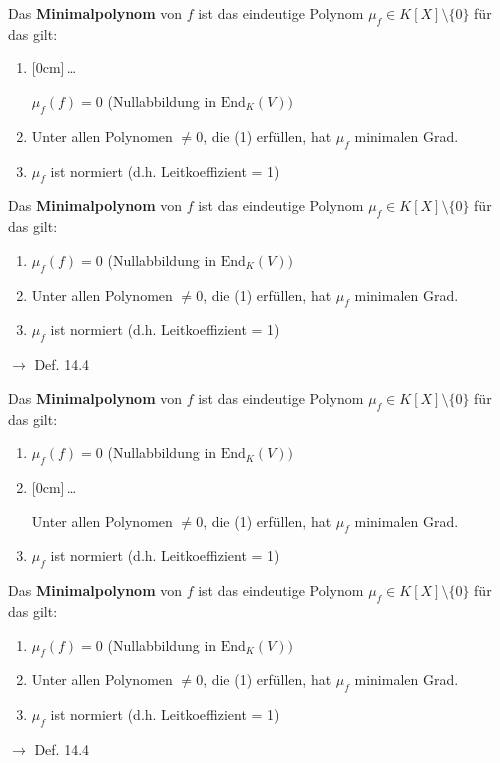 \documentclass[11pt]{article}
\renewcommand{\cite}[1]{\par\bigskip\hfill{\color{gray}\tiny\(\to\) #1}}
\newcommand{\hide}[1]{\parbox{0cm}{\raisebox{-7pt}[0cm]{\dots}}\color{white}#1\color{black}}
\let\olddots\dots
\renewcommand{\dots}{\,\olddots\,}
\newenvironment{field}{}{\newpage}
\newif\ifnote
\newenvironment{note}{\notetrue}{\notefalse}
\newcommand{\localtag}{}
\newcommand{\globaltag}{}
\newcommand{\uuid}{}
\newcommand{\tags}[1]{
    \ifnote
        \renewcommand{\localtag}{#1}
    \else
        \renewcommand{\globaltag}{#1}
    \fi
    }
\newcommand{\xplain}[1]{\renewcommand{\uuid}{#1}}
\begin{document}
\begin{note}
    \tags{Def}
    \xplain{ec41baef-a06e-43ff-a6d0-24b3ae262be4}

    \begin{field}
        Das \textbf{Minimalpolynom} von $f$ ist das eindeutige Polynom $\mu_f\in K[X]\setminus{\{0\}}$ für das gilt:
        \begin{enumerate}[(1)]
            \item \hide{$\mu_f(f)=0$ (Nullabbildung in $\text{End}_K(V))$}
            \item Unter allen Polynomen $\neq 0$, die (1) erfüllen, hat $\mu_f$ minimalen Grad.
            \item $\mu_f$ ist normiert (d.h. Leitkoeffizient = 1)
        \end{enumerate}
    \end{field}
    \begin{field}
        Das \textbf{Minimalpolynom} von $f$ ist das eindeutige Polynom $\mu_f\in K[X]\setminus{\{0\}}$ für das gilt:
        \begin{enumerate}[(1)]
            \item $\mu_f(f)=0$ (Nullabbildung in $\text{End}_K(V))$
            \item Unter allen Polynomen $\neq 0$, die (1) erfüllen, hat $\mu_f$ minimalen Grad.
            \item $\mu_f$ ist normiert (d.h. Leitkoeffizient = 1)
        \end{enumerate}
        \cite{Def. 14.4}
    \end{field}

    \begin{field}
        Das \textbf{Minimalpolynom} von $f$ ist das eindeutige Polynom $\mu_f\in K[X]\setminus{\{0\}}$ für das gilt:
        \begin{enumerate}[(1)]
            \item $\mu_f(f)=0$ (Nullabbildung in $\text{End}_K(V))$
            \item \hide{Unter allen Polynomen $\neq 0$, die (1) erfüllen, hat $\mu_f$ minimalen Grad.}
            \item $\mu_f$ ist normiert (d.h. Leitkoeffizient = 1)
        \end{enumerate}
    \end{field}
    \begin{field}
        Das \textbf{Minimalpolynom} von $f$ ist das eindeutige Polynom $\mu_f\in K[X]\setminus{\{0\}}$ für das gilt:
        \begin{enumerate}[(1)]
            \item $\mu_f(f)=0$ (Nullabbildung in $\text{End}_K(V))$
            \item Unter allen Polynomen $\neq 0$, die (1) erfüllen, hat $\mu_f$ minimalen Grad.
            \item $\mu_f$ ist normiert (d.h. Leitkoeffizient = 1)
        \end{enumerate}
        \cite{Def. 14.4}
    \end{field}


\end{note}
\end{document}
